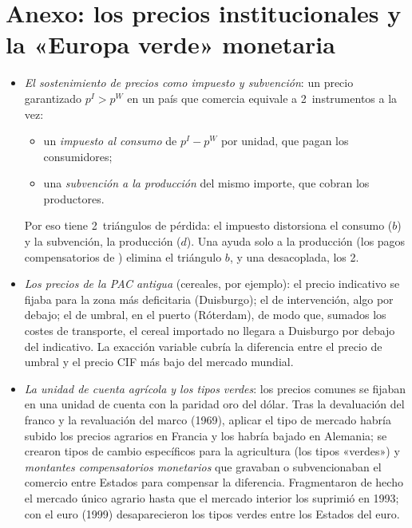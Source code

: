 \documentclass[11pt]{article}
\begin{document}
\clearpage
\appendix

\section{Anexo: los precios institucionales\cortetitulo{} y la «Europa verde» monetaria}\label{anexo:precios}

\begin{itemize}
\item \emph{El sostenimiento de precios como impuesto y subvención}: un precio garantizado $p^I>p^W$ en un país que comercia equivale a 2~instrumentos a la vez:
  \begin{itemize}
  \item un \emph{impuesto al consumo} de $p^I-p^W$ por unidad, que pagan los consumidores;
  \item una \emph{subvención a la producción} del mismo importe, que cobran los productores.
  \end{itemize}
  Por eso tiene 2~triángulos de pérdida: el impuesto distorsiona el consumo ($b$) y la subvención, la producción ($d$). Una ayuda solo a la producción (los pagos compensatorios de ) elimina el triángulo $b$, y una desacoplada, los 2.
\item \emph{Los precios de la PAC antigua} (cereales, por ejemplo): el precio indicativo se fijaba para la zona más deficitaria (Duisburgo); el de intervención, algo por debajo; el de umbral, en el puerto (Róterdam), de modo que, sumados los costes de transporte, el cereal importado no llegara a Duisburgo por debajo del indicativo. La exacción variable cubría la diferencia entre el precio de umbral y el precio CIF más bajo del mercado mundial.
\item \emph{La unidad de cuenta agrícola y los tipos verdes}: los precios comunes se fijaban en una unidad de cuenta con la paridad oro del dólar. Tras la devaluación del franco y la revaluación del marco (1969), aplicar el tipo de mercado habría subido los precios agrarios en Francia y los habría bajado en Alemania; se crearon tipos de cambio específicos para la agricultura (los tipos «verdes») y \emph{montantes compensatorios monetarios} que gravaban o subvencionaban el comercio entre Estados para compensar la diferencia. Fragmentaron de hecho el mercado único agrario hasta que el mercado interior los suprimió en 1993; con el euro (1999) desaparecieron los tipos verdes entre los Estados del euro\nocite{CamareroTamaritAnchuelo2019}.
\end{itemize}
\end{document}
